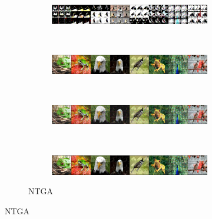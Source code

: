 \documentclass[conference]{IEEEtran}
\theoremstyle{definition}
\theoremstyle{remark}
\theoremstyle{proposition}
\begin{document}
\begin{figure}[htp!]
	\centering
        \begin{subfigure}{.90\textwidth}
        \hspace{0.95em}
    	\begin{subfigure}{.90\textwidth}
    		\centering
    		\includegraphics[width=1.0\textwidth, valign=c]{samples/ImageNet-NTGA/pert_adv.png}
    	\end{subfigure}\\
        \hspace{0.75em}
    	\begin{subfigure}{.90\textwidth}
    		\centering
    		\includegraphics[width=1.0\textwidth, valign=c]{samples/ImageNet-NTGA/original_input.png}
    	\end{subfigure}\\
        \hspace{0.75em}
    	\begin{subfigure}{.90\textwidth}
    		\centering
    		\includegraphics[width=1.0\textwidth, valign=c]{samples/ImageNet-NTGA/init_0.png}
    	\end{subfigure}\\
        \hspace{0.95em}
    	\begin{subfigure}{.90\textwidth}
    		\centering
    		\includegraphics[width=1.0\textwidth, valign=c]{samples/ImageNet-NTGA/samples_0.png}
    	\end{subfigure}
	\caption{NTGA~\citep{yuan2021ntga}}
    \vspace{2em}

\end{subfigure}
\end{figure}
\end{document}
